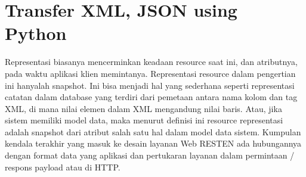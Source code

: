 \section{Transfer XML, JSON using Python}
Representasi biasanya mencerminkan keadaan resource saat ini, dan atributnya, pada waktu aplikasi klien memintanya. Representasi resource dalam pengertian ini hanyalah snapshot. Ini bisa menjadi hal yang sederhana seperti representasi catatan dalam database yang terdiri dari pemetaan antara nama kolom dan tag XML, di mana nilai elemen dalam XML mengandung nilai baris. Atau, jika sistem memiliki model data, maka menurut definisi ini resource representasi adalah snapshot dari atribut salah satu hal dalam model data sistem. Kumpulan kendala terakhir yang masuk ke desain layanan Web RESTEN ada hubungannya dengan format data yang aplikasi dan pertukaran layanan dalam permintaan / respons payload atau di HTTP\cite{rodriguez2008restful}.
